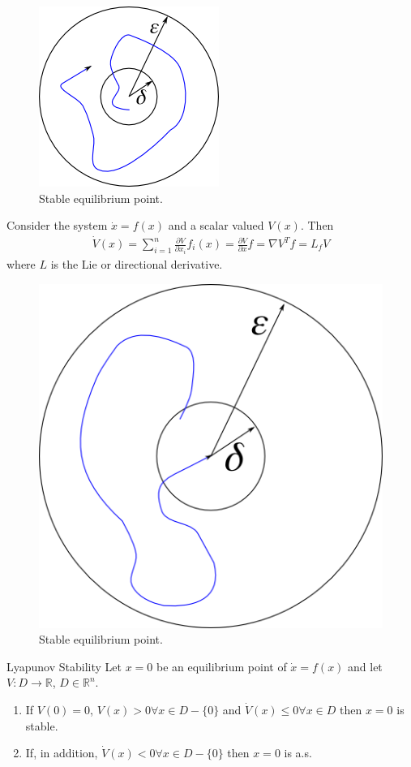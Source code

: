 \begin{figure}[ht!]
	\centering
	\includegraphics[width=.4\textwidth]{images/07stableEqPoint}
	\caption{Stable equilibrium point.}
	\label{fig:07stableEqPoint}
\end{figure}

\begin{definition}
Consider the system $\dot{x}=f(x)$ and a scalar valued $V(x)$. Then
\begin{align*}
\dot{V}(x) = \sum_{i=1}^n \frac{\partial V}{\partial x_i} f_i(x) = \frac{\partial V}{\partial x}f = \nabla V^Tf = L_fV
\end{align*}
where $L$ is the Lie or directional derivative.
\end{definition}

\begin{figure}[ht!]
	\centering
	\includegraphics[width=.4\textwidth]{images/07attractiveNotStable}
	\caption{Stable equilibrium point.}
	\label{fig:07attractiveNotStable}
\end{figure}

\begin{theorem}{Lyapunov Stability}
Let $x=0$ be an equilibrium point of $\dot{x}=f(x)$ and let $V:D\to\mathbb{R}$, $D\in\mathbb{R}^n$.
\begin{enumerate}
\item If $V(0)=0$, $V(x)>0 \forall x \in D - \{0\}$ and $\dot{V}(x)\leq0 \forall x\in D$ then $x=0$ is stable.
\item If, in addition, $\dot{V}(x)<0 \forall x\in D-\{0\}$ then $x=0$ is a.s.
\end{enumerate}
\end{theorem}

